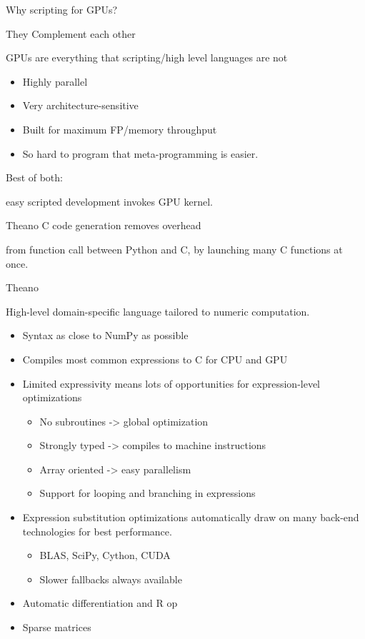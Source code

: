 \documentclass[utf8x,xcolor=pdftex,dvipsnames,table]{beamer}
\begin{document}
\begin{frame}{Why scripting for GPUs?}
  \begin{bf}They Complement each other\end{bf}

  GPUs are everything that scripting/high level languages are not

  \begin{itemize}
    \item Highly parallel
    \item Very architecture-sensitive
    \item Built for maximum FP/memory throughput
    \item So hard to program that meta-programming is easier.
  \end{itemize}

  \begin{bf}Best of both:\end{bf} easy scripted development invokes GPU kernel.

  \begin{bf}Theano C code generation removes overhead\end{bf} from
  function call between Python and C, by launching many C functions at once.

\end{frame}

\begin{frame}{Theano}

  High-level domain-specific language tailored to numeric computation.

  \begin{itemize}
    \item Syntax as close to NumPy as possible
    \item Compiles most common expressions to C for CPU and GPU
    \item Limited expressivity means lots of opportunities for expression-level optimizations
    \begin{itemize}
      \item No subroutines -> global optimization
      \item Strongly typed -> compiles to machine instructions
      \item Array oriented -> easy parallelism
      \item Support for looping and branching in expressions
    \end{itemize}
    \item Expression substitution optimizations automatically draw
    on many back-end technologies for best performance.
    \begin{itemize}
      \item BLAS, SciPy, Cython, CUDA
      \item Slower fallbacks always available
    \end{itemize}
    \item Automatic differentiation and R op

    \item Sparse matrices
  \end{itemize}
\end{frame}
\end{document}
